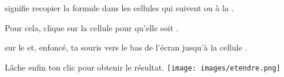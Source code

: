 \begin{Methode}
     signifie recopier la formule dans les cellules qui suivent  ou à la . 
        
    \begin{MultiColonnes}{5}
        \tcbitem[raster multicolumn=3] Pour cela, clique sur la cellule  pour qu'elle soit . 
        
             sur le  et,  enfoncé,  ta souris vers le bas de l'écran jusqu'à la cellule . 

            Lâche enfin ton clic pour obtenir le résultat.
        \tcbitem[raster multicolumn=2,halign=center] \texttt{[image: images/etendre.png]}
    \end{MultiColonnes}
\end{Methode} 
\def\rdifficulty{2}
